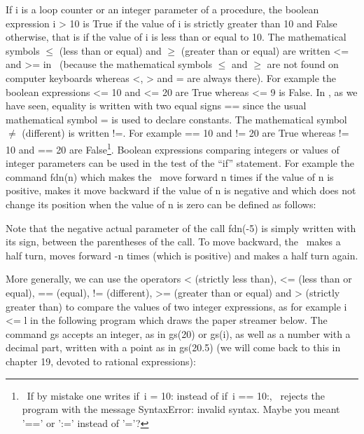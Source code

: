 If {\idt i} is a loop counter or an integer parameter of a procedure,
the boolean expression {\idt i > 10} is {\mcl True}
if the value of {\idt i} is strictly greater than 10 and {\mcl
False} otherwise, that is if the value of {\idt
i} is less than or equal to 10.  The mathematical symbols $\leq$
(less than or equal) and $\geq$ (greater than or equal) are written {\idt <=} and
{\idt >=} in \python\ (because the mathematical symbols $\leq$ and $\geq$ are
not found on computer keyboards whereas {\idt <}, {\idt >}
and {\idt =} are always there).  For example the boolean
expressions { <= 10} and { <= 20} are {\mcl True}
whereas { <= 9} is {\mcl False}.  In
\python, as we have seen, equality is written with two equal signs {\idt ==}
since the usual mathematical symbol {\idt =} is used to declare constants.
The mathematical symbol $\neq$ (different) is written {\ttfamily\idt !=}.
For example { == 10} and {\ttfamily{} != 20} are {\mcl True}
whereas {\ttfamily{} != 10} and { == 20} are {\mcl
False}\footnote{\ If by mistake one writes {\mcl if}\ {\idt i = 10:}
instead of {\mcl if}\ {\idt i == 10:}, \python\ rejects the program with
the message {\idt SyntaxError: invalid syntax. Maybe you meant '==' or ':='
instead of '='?}}.
Boolean expressions comparing
integers or values of integer parameters can be used in the test
of the ``if'' statement.  For example the command {\idt fdn(n)} which
makes the \robot\ move forward {\idt n} times if the value of {\idt n} is
positive, makes it move backward if the value of {\idt n} is negative and which
does not change its position when the value of {\idt n} is zero can
be defined as follows:



\noindent Note that the negative actual parameter of the call
{\idt fdn(-5)} is simply written with its sign, between the parentheses of
the call. To move backward, the \robot\ makes a half turn, moves forward {\idt -n} times
(which is positive) and makes a half turn again.

More generally, we can use the operators {\idt <} (strictly less than), {\idt <=} (less than or equal),
{\idt ==} (equal), {\ttfamily\idt !=} (different), {\idt >=} (greater than or equal) and {\idt >} (strictly greater than) to compare the values
of two integer expressions, as for example {\idt i <= l} in the following program which draws the paper streamer
below. The command {\idt gs} accepts an integer, as
in {\idt gs(20)} or {\idt gs(i)}, as well as a number with a decimal part, written
with a point as in {\idt gs(20.5)} (we will come back to this
in chapter 19, devoted to rational expressions):

